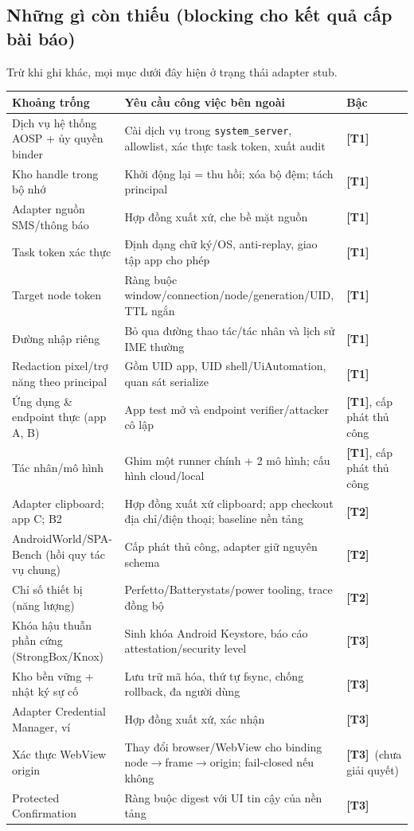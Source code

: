 \documentclass[11pt,a4paper]{article}
\newcommand{\code}[1]{\texttt{\small #1}}
\newcommand{\Tone}{\textbf{\color{shgreen}[T1]}}
\newcommand{\Ttwo}{\textbf{\color{shblue}[T2]}}
\newcommand{\Tthree}{\textbf{\color{shgray}[T3]}}
\begin{document}
\subsection{Những gì còn thiếu (blocking cho kết quả cấp bài báo)}

Trừ khi ghi khác, mọi mục dưới đây hiện ở trạng thái adapter stub.

\begin{longtable}{@{}p{4.9cm}p{7.6cm}p{2.7cm}@{}}
\toprule
\textbf{Khoảng trống} & \textbf{Yêu cầu công việc bên ngoài} & \textbf{Bậc} \\
\midrule
\endhead
Dịch vụ hệ thống AOSP + ủy quyền binder & Cài dịch vụ trong \code{system\_server}, allowlist, xác thực task
token, xuất audit & \Tone \\
Kho handle trong bộ nhớ & Khởi động lại = thu hồi; xóa bộ đệm; tách principal & \Tone \\
Adapter nguồn SMS/thông báo & Hợp đồng xuất xứ, che bề mặt nguồn & \Tone \\
Task token xác thực & Định dạng chữ ký/OS, anti-replay, giao tập app cho phép & \Tone \\
Target node token & Ràng buộc window/connection/node/generation/UID, TTL ngắn & \Tone \\
Đường nhập riêng & Bỏ qua đường thao tác/tác nhân và lịch sử IME thường & \Tone \\
Redaction pixel/trợ năng theo principal & Gồm UID app, UID shell/UiAutomation, quan sát serialize & \Tone \\
Ứng dụng \& endpoint thực (app A, B) & App test mở và endpoint verifier/attacker cô lập & \Tone,
cấp phát thủ công \\
Tác nhân/mô hình & Ghim một runner chính + 2 mô hình; cấu hình cloud/local & \Tone, cấp phát thủ công \\
Adapter clipboard; app C; B2 & Hợp đồng xuất xứ clipboard; app checkout địa chỉ/điện thoại; baseline nền tảng & \Ttwo \\
AndroidWorld/SPA-Bench (hồi quy tác vụ chung) & Cấp phát thủ công, adapter giữ nguyên schema & \Ttwo \\
Chỉ số thiết bị (năng lượng) & Perfetto/Batterystats/power tooling, trace đồng bộ & \Ttwo \\
Khóa hậu thuẫn phần cứng (StrongBox/Knox) & Sinh khóa Android Keystore, báo cáo attestation/security level & \Tthree \\
Kho bền vững + nhật ký sự cố & Lưu trữ mã hóa, thứ tự fsync, chống rollback, đa người dùng & \Tthree \\
Adapter Credential Manager, ví & Hợp đồng xuất xứ, xác nhận & \Tthree \\
Xác thực WebView origin & Thay đổi browser/WebView cho binding node$\to$frame$\to$origin; fail-closed nếu không & \Tthree\ (chưa giải quyết) \\
Protected Confirmation & Ràng buộc digest với UI tin cậy của nền tảng & \Tthree \\
\bottomrule
\end{longtable}
\end{document}
